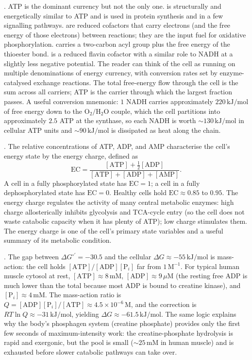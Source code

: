 . ATP is the dominant currency but not
the only one.  is structurally and energetically similar
to ATP and is used in protein synthesis and in a few signalling
pathways.  are reduced cofactors that carry
electrons (and the free energy of those electrons) between reactions;
they are the input fuel for oxidative phosphorylation. 
carries a two-carbon acyl group plus the free energy of the thioester
bond.  is a reduced flavin cofactor with a similar
role to NADH at a slightly less negative potential. The reader can
think of the cell as running on multiple denominations of energy
currency, with conversion rates set by enzyme-catalysed exchange
reactions. The total free-energy flow through the cell is the sum
across all carriers; ATP is the carrier through which the largest
fraction passes. A useful conversion mnemonic: $1$ NADH carries
approximately $220\,\text{kJ}/\text{mol}$ of free energy down to the
$\text{O}_2/\text{H}_2\text{O}$ couple, which the cell partitions into
approximately $2.5$ ATP at the synthase, so each NADH is worth $\sim
130\,\text{kJ}/\text{mol}$ in cellular ATP units and $\sim 90\,\text{kJ}/
\text{mol}$ is dissipated as heat along the chain.

. The relative concentrations of ATP, ADP,
and AMP characterise the cell's energy state by the energy charge,
defined as
\[
\text{EC} = \frac{[\text{ATP}] + \frac{1}{2}[\text{ADP}]}{[\text{ATP}] + [\text{ADP}] + [\text{AMP}]}.
\]
A cell in a fully phosphorylated state has $\text{EC} = 1$; a cell
in a fully dephosphorylated state has $\text{EC} = 0$. Healthy cells
hold $\text{EC} \approx 0.85$ to $0.95$. The energy charge regulates
the activity of many central metabolic enzymes: high charge
allosterically inhibits glycolysis and TCA-cycle entry (so the cell
does not waste catabolic capacity when it has plenty of ATP); low
charge stimulates them. The energy charge is one of the cell's
primary state variables and a useful summary of its metabolic
condition.

. The
gap between $\Delta G^{\circ\prime} = -30.5$ and the cellular $\Delta G
\approx -55\,\text{kJ}/\text{mol}$ is mass-action: the cell holds
$[\text{ATP}]/[\text{ADP}][\text{P}_i]$ far from $1\,\text{M}^{-1}$.
For typical human muscle cytosol at rest, $[\text{ATP}] \approx
8\,\text{mM}$, $[\text{ADP}] \approx 9\,\mu\text{M}$ (the resting
free ADP is much lower than the total because most ADP is bound to
creatine kinase), and $[\text{P}_i] \approx 4\,\text{mM}$. The
mass-action ratio is $Q = [\text{ADP}][\text{P}_i]/[\text{ATP}] \approx
4.5 \times 10^{-6}\,\text{M}$, and the correction is $RT \ln Q \approx
-31\,\text{kJ}/\text{mol}$, yielding $\Delta G \approx -61.5\,
\text{kJ}/\text{mol}$. The same logic explains why the body's
phosphagen system (creatine phosphate) provides only the first few
seconds of maximum-intensity work: the creatine-phosphate hydrolysis
is rapid and exergonic, but the pool is small ($\sim 25\,\text{mM}$
in human muscle) and is exhausted before slower catabolic pathways
can take over.

